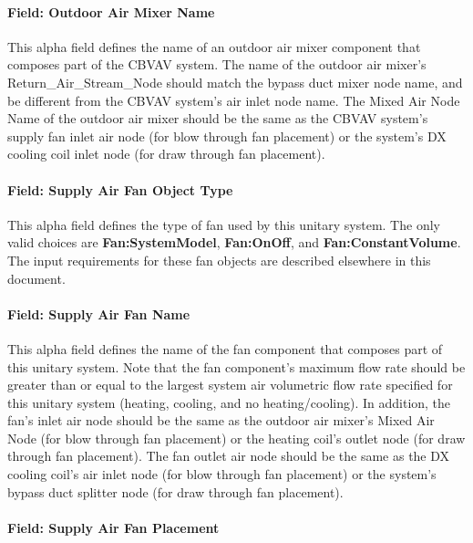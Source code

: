 \paragraph{Field: Outdoor Air Mixer Name}\label{field-outdoor-air-mixer-name}

This alpha field defines the name of an outdoor air mixer component that composes part of the CBVAV system. The name of the outdoor air mixer's Return\_Air\_Stream\_Node should match the bypass duct mixer node name, and be different from the CBVAV system's air inlet node name. The Mixed Air Node Name of the outdoor air mixer should be the same as the CBVAV system's supply fan inlet air node (for blow through fan placement) or the system's DX cooling coil inlet node (for draw through fan placement).

\paragraph{Field: Supply Air Fan Object Type}\label{field-supply-air-fan-object-type-3}

This alpha field defines the type of fan used by this unitary system. The only valid choices are \textbf{Fan:SystemModel}, \textbf{Fan:OnOff}, and \textbf{Fan:ConstantVolume}. The input requirements for these fan objects are described elsewhere in this document.

\paragraph{Field: Supply Air Fan Name}\label{field-supply-air-fan-name-3}

This alpha field defines the name of the fan component that composes part of this unitary system. Note that the fan component's maximum flow rate should be greater than or equal to the largest system air volumetric flow rate specified for this unitary system (heating, cooling, and no heating/cooling). In addition, the fan's inlet air node should be the same as the outdoor air mixer's Mixed Air Node (for blow through fan placement) or the heating coil's outlet node (for draw through fan placement). The fan outlet air node should be the same as the DX cooling coil's air inlet node (for blow through fan placement) or the system's bypass duct splitter node (for draw through fan placement).

\paragraph{Field: Supply Air Fan Placement}\label{field-supply-air-fan-placement-1}

